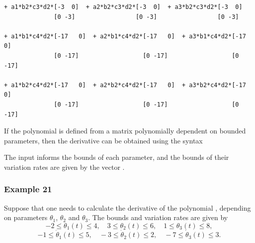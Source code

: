 \documentclass[english,11pt]{article}
\theoremstyle{break} \theorembodyfont{\small\rm}
\begin{document}
\begin{minipage}{17.2cm}
\begin{lstlisting}[rulecolor=\color{red}]
+ a1*b2*c3*d2*[-3  0]  + a2*b2*c3*d2*[-3  0]  + a3*b2*c3*d2*[-3  0]  
              [0 -3]                 [0 -3]                 [0 -3]   

+ a1*b1*c4*d2*[-17   0]  + a2*b1*c4*d2*[-17   0]  + a3*b1*c4*d2*[-17   0]  
              [0 -17]                  [0 -17]                  [0 -17]    
              
+ a1*b2*c4*d2*[-17   0]  + a2*b2*c4*d2*[-17   0]  + a3*b2*c4*d2*[-17   0]                                                                                                                                                                                                                 
              [0 -17]                  [0 -17]                  [0 -17]                                                                                                                                                                                                                                 
\end{lstlisting}
\end{minipage}
\vspace{0.2cm}

If the polynomial is defined from a matrix polynomially dependent on bounded
parameters, then the derivative can be obtained using the syntax

\vspace{0.5cm}%
\begin{minipage}{9.5cm}
\end{minipage}
\vspace{0.2cm}

The input  informs the bounds of each parameter, and the bounds
of their variation rates are given by the vector .


\subsubsection*{Example 21}

Suppose that one needs to calculate the derivative of the polynomial ,
depending on  parameters $\theta_1$, $\theta_2$ and $\theta_3$. The bounds and 
variation rates are given by
\[
 -2 \leq \theta_1(t) \leq 4, \quad 
 3 \leq \theta_2(t) \leq 6, \quad
 1 \leq \theta_3(t) \leq 8,
\]
\[
 -1 \leq \dot{\theta}_1(t) \leq 5, \quad 
 -3 \leq \dot{\theta}_2(t) \leq 2, \quad
 -7 \leq \dot{\theta}_3(t) \leq 3.
\]
\end{document}
